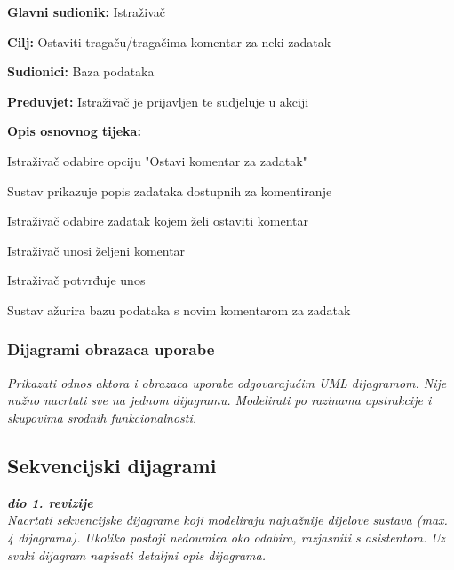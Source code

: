 					\noindent {}
					\begin{packed_item}
						
						\item \textbf{Glavni sudionik: }Istraživač
						\item  \textbf{Cilj:} Ostaviti tragaču/tragačima komentar za neki zadatak 
						\item  \textbf{Sudionici:} Baza podataka
						\item  \textbf{Preduvjet:} Istraživač je prijavljen te sudjeluje u akciji 
						\item  \textbf{Opis osnovnog tijeka:}
						
						\item[] \begin{packed_enum}
							
							\item Istraživač odabire opciju "Ostavi komentar za zadatak" 
							\item Sustav prikazuje popis zadataka dostupnih za komentiranje 
							\item Istraživač odabire zadatak kojem želi ostaviti komentar 
							\item Istraživač unosi željeni komentar 
							\item Istraživač potvrđuje unos 
							\item Sustav ažurira bazu podataka s novim komentarom za zadatak 
						\end{packed_enum}
					\end{packed_item}
					
				\subsubsection{Dijagrami obrazaca uporabe}
					
					\textit{Prikazati odnos aktora i obrazaca uporabe odgovarajućim UML dijagramom. Nije nužno nacrtati sve na jednom dijagramu. Modelirati po razinama apstrakcije i skupovima srodnih funkcionalnosti.}
				\eject		
				
			\subsection{Sekvencijski dijagrami}
				
				\textbf{\textit{dio 1. revizije}}\\
				
				\textit{Nacrtati sekvencijske dijagrame koji modeliraju najvažnije dijelove sustava (max. 4 dijagrama). Ukoliko postoji nedoumica oko odabira, razjasniti s asistentom. Uz svaki dijagram napisati detaljni opis dijagrama.}
				\eject
	
